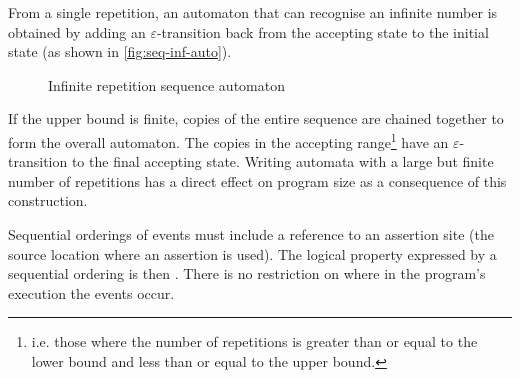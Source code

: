 From a single repetition, an automaton that can recognise an infinite
number is obtained by adding an $\varepsilon$-transition back from the
accepting state to the initial state (as shown in
\autoref{fig:seq-inf-auto}).

\begin{figure}
  \centering
  \caption{Infinite repetition sequence automaton}
  \label{fig:seq-inf-auto}
\end{figure}

If the upper bound is finite, copies of the entire sequence are chained together
to form the overall automaton. The copies in the accepting range\footnote{i.e.
those where the number of repetitions is greater than or equal to the lower
bound and less than or equal to the upper bound.} have an
$\varepsilon$-transition to the final accepting state. Writing automata with a
large but finite number of repetitions has a direct effect on program size as a
consequence of this construction.

Sequential orderings of events must include a reference to an assertion site
(the source location where an assertion is used). The logical property expressed
by a sequential ordering is then . There is no restriction on where in the program's execution the events
occur.

